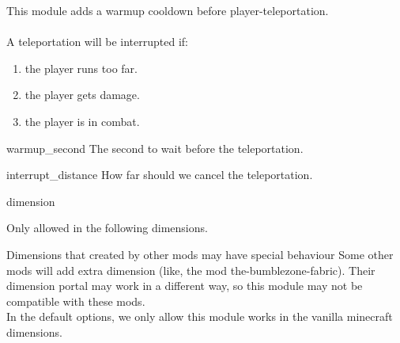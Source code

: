 
This module adds a warmup cooldown before player-teleportation.\\
\\
A teleportation will be interrupted if:
\begin{enumerate}
    \item the player runs too far.
    \item the player gets damage.
    \item the player is in combat.
\end{enumerate}

\begin{Configuration}
    \item[warmup\_second]{
        The second to wait before the teleportation.
    }

    \item[interrupt\_distance]{
        How far should we cancel the teleportation.
    }

    \item[dimension]{
        Only allowed in the following dimensions.
        \begin{warn}{Dimensions that created by other mods may have special behaviour}
            Some other mods will add extra dimension (like, the mod the-bumblezone-fabric).
            Their dimension portal may work in a different way, so this module may not be compatible with these mods.\\
            In the default options, we only allow this module works in the vanilla minecraft dimensions.
        \end{warn}
    }
\end{Configuration}

